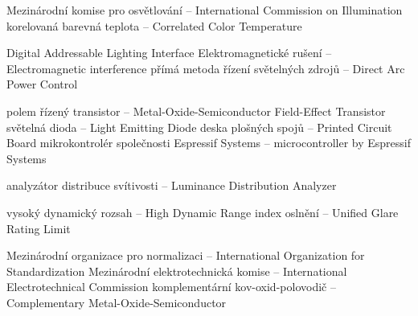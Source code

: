 


   {Mezinárodní komise pro osvětlování -- International Commission on Illumination}
   {korelovaná barevná teplota -- Correlated Color Temperature}

  {Digital Addressable Lighting Interface}
  {Elektromagnetické rušení -- Electromagnetic interference}
 {přímá metoda řízení světelných zdrojů -- Direct Arc Power Control}

 {polem řízený transistor -- Metal-Oxide-Semiconductor Field-Effect Transistor}
    {světelná dioda -- Light Emitting Diode}
    {deska plošných spojů -- Printed Circuit Board}
  {mikrokontrolér společnosti Espressif Systems -- microcontroller by Espressif Systems}

    {analyzátor distribuce svítivosti -- Luminance Distribution Analyzer}

    {vysoký dynamický rozsah -- High Dynamic Range}
   {index oslnění -- Unified Glare Rating Limit}

    {Mezinárodní organizace pro normalizaci -- International Organization for Standardization}
    {Mezinárodní elektrotechnická komise -- International Electrotechnical Commission}
   {komplementární kov-oxid-polovodič -- Complementary Metal-Oxide-Semiconductor}

